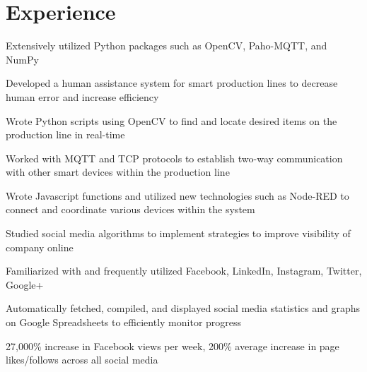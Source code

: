\documentclass[]{resume-openfont}
\begin{document}
\begin{minipage}[t]{0.66\textwidth} 


\section{Experience}

\vspace{\topsep} %
\begin{tightemize}
\item Extensively utilized Python packages such as OpenCV, Paho-MQTT, and NumPy
\item Developed a human assistance system for smart production lines to decrease human error and increase efficiency
\item Wrote Python scripts using OpenCV to find and locate desired items on the production line in real-time
\item Worked with MQTT and TCP protocols to establish two-way communication with other smart devices within the production line
\item Wrote Javascript functions and utilized new technologies such as Node-RED to connect and coordinate various devices within the system
\end{tightemize}
\sectionsep

\vspace{\topsep} %
\begin{tightemize}
\item Studied social media algorithms to implement strategies to improve visibility of company online 
\item Familiarized with and frequently utilized Facebook, LinkedIn, Instagram, Twitter, Google+ 
\item Automatically fetched, compiled, and displayed social media statistics and graphs on Google Spreadsheets to efficiently monitor progress 
\item 27,000\% increase in Facebook views per week, 200\% average increase in page likes/follows across all social media
\end{tightemize}
\sectionsep


\end{minipage}
\end{document}

